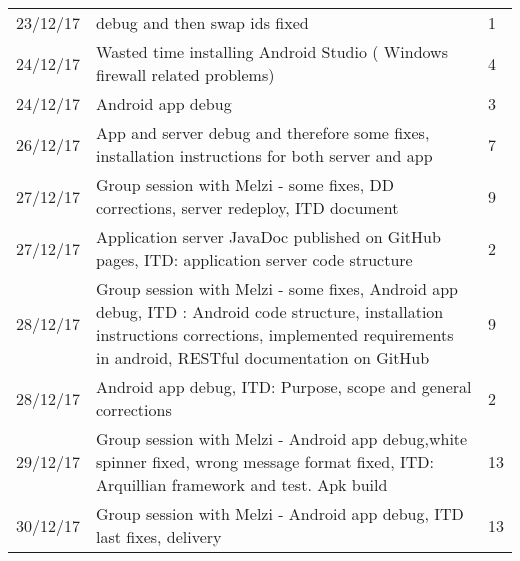 \begin{longtable}{ p{2cm} p{10cm} p{3cm}}
	23/12/17 & debug and then swap ids fixed & 1 \\
	24/12/17 & Wasted time installing Android Studio ( Windows firewall related problems) & 4 \\
	24/12/17 & Android app debug & 3 \\
	26/12/17 & App and server debug and therefore some fixes, installation instructions for both server and app & 7 \\
	27/12/17 & Group session with Melzi - some fixes, DD corrections, server redeploy, ITD document & 9 \\
	27/12/17 & Application server JavaDoc published on GitHub pages, ITD: application server code structure & 2 \\
	28/12/17 & Group session with Melzi - some fixes, Android app debug, ITD : Android code structure, installation instructions corrections, implemented requirements in android, RESTful documentation on GitHub  & 9 \\
	28/12/17 &  Android app debug, ITD: Purpose, scope and general corrections & 2 \\
	29/12/17 & Group session with Melzi - Android app debug,white spinner fixed, wrong message format fixed, ITD: Arquillian framework and test. Apk build & 13 \\
	30/12/17 & Group session with Melzi - Android app debug, ITD last fixes, delivery & 13 \\
\end{longtable}
